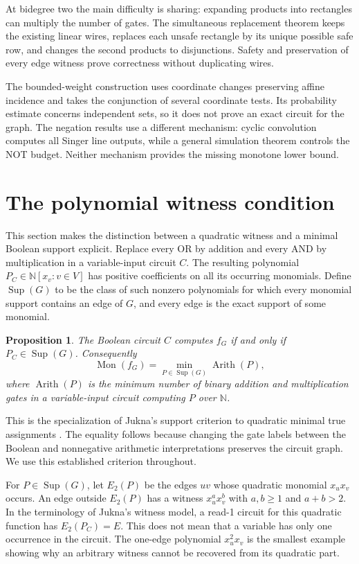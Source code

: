 \documentclass[11pt]{article}
\newcommand{\N}{\mathbb N}
\DeclareMathOperator{\Mon}{Mon}
\DeclareMathOperator{\Arith}{Arith}
\DeclareMathOperator{\Sup}{Sup}
\newtheorem{proposition}[theorem]{Proposition}
\theoremstyle{definition}
\begin{document}
At bidegree two the main difficulty is sharing: expanding products into rectangles can multiply the number of gates. The simultaneous replacement theorem keeps the existing linear wires, replaces each unsafe rectangle by its unique possible safe row, and changes the second products to disjunctions. Safety and preservation of every edge witness prove correctness without duplicating wires.

The bounded-weight construction uses coordinate changes preserving affine incidence and takes the conjunction of several coordinate tests. Its probability estimate concerns independent sets, so it does not prove an exact circuit for the graph. The negation results use a different mechanism: cyclic convolution computes all Singer line outputs, while a general simulation theorem controls the NOT budget. Neither mechanism provides the missing monotone lower bound.

\section{The polynomial witness condition}
This section makes the distinction between a quadratic witness and a minimal Boolean support explicit.
Replace every OR by addition and every AND by multiplication in a variable-input circuit $C$. The resulting polynomial $P_C\in\N[x_v:v\in V]$ has positive coefficients on all its occurring monomials. Define $\Sup(G)$ to be the class of such nonzero polynomials for which every monomial support contains an edge of $G$, and every edge is the exact support of some monomial.

\begin{proposition}\label{prop:support}
The Boolean circuit $C$ computes $f_G$ if and only if $P_C\in\Sup(G)$. Consequently
\[
 \Mon(f_G)=\min_{P\in\Sup(G)}\Arith(P),
\]
where $\Arith(P)$ is the minimum number of binary addition and multiplication gates in a variable-input circuit computing $P$ over $\N$.
\end{proposition}
This is the specialization of Jukna's support criterion to quadratic minimal true assignments \citep[Lemma~1, p.~7 of the arXiv manuscript]{JuknaRead}. The equality follows because changing the gate labels between the Boolean and nonnegative arithmetic interpretations preserves the circuit graph. We use this established criterion throughout.

For $P\in\Sup(G)$, let $E_2(P)$ be the edges $uv$ whose quadratic monomial $x_ux_v$ occurs. An edge outside $E_2(P)$ has a witness $x_u^ax_v^b$ with $a,b\geq1$ and $a+b>2$. In the terminology of Jukna's witness model, a read-1 circuit for this quadratic function has $E_2(P_C)=E$. This does not mean that a variable has only one occurrence in the circuit.
The one-edge polynomial $x_u^2x_v$ is the smallest example showing why an arbitrary witness cannot be recovered from its quadratic part.
\end{document}
